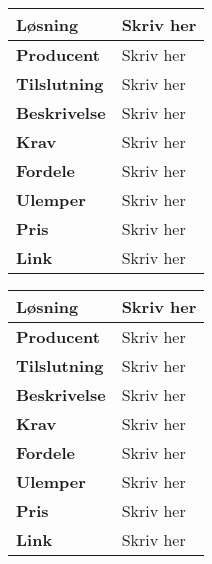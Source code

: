 \begin{table}[!htbp] \centering	
\begin{tabular}{|p{6cm}|p{8cm}|}
	\hline
		\textbf{Løsning}				&Skriv her 			\\\hline %
		\textbf{Producent} 			&Skriv her 			\\\hline 
		\textbf{Tilslutning} 		&Skriv her 			\\\hline 
		\textbf{Beskrivelse} 		&Skriv her 			\\\hline 
		\textbf{Krav} 				&Skriv her 			\\\hline 
		\textbf{Fordele}				&Skriv her 			\\\hline 
		\textbf{Ulemper} 			&Skriv her 			\\\hline 
		\textbf{Pris} 				&Skriv her			\\\hline
		\textbf{Link} 				&Skriv her			\\\hline	
	

\end{tabular}
\end{table}

\begin{table}[!htbp] \centering	
\begin{tabular}{|p{6cm}|p{8cm}|}
	\hline
		\textbf{Løsning}				&Skriv her 			\\\hline %
		\textbf{Producent} 			&Skriv her 			\\\hline 
		\textbf{Tilslutning} 		&Skriv her 			\\\hline 
		\textbf{Beskrivelse} 		&Skriv her 			\\\hline 
		\textbf{Krav} 				&Skriv her 			\\\hline 
		\textbf{Fordele}				&Skriv her 			\\\hline 
		\textbf{Ulemper} 			&Skriv her 			\\\hline 
		\textbf{Pris} 				&Skriv her			\\\hline
		\textbf{Link} 				&Skriv her			\\\hline	
	

\end{tabular}
\end{table}
